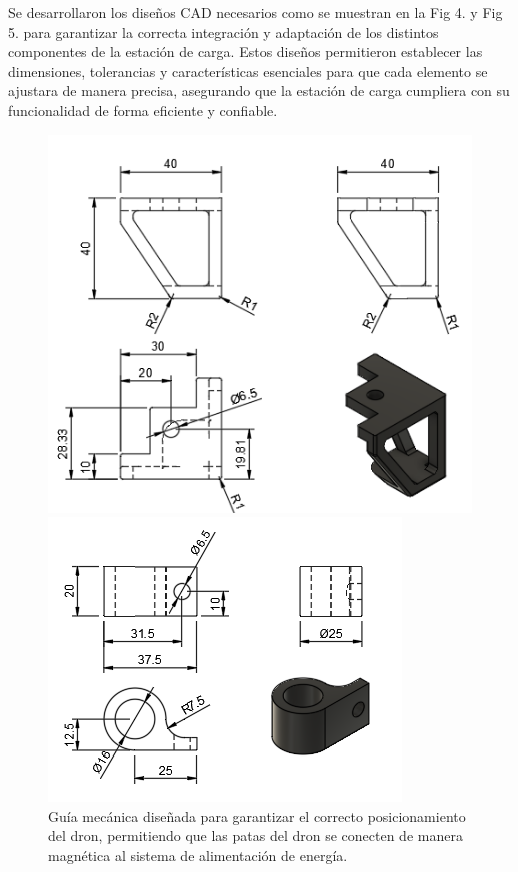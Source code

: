     Se desarrollaron los diseños CAD necesarios como se muestran en la Fig 4. y Fig 5. para garantizar la correcta integración y adaptación de los distintos componentes de la estación de carga. Estos diseños permitieron establecer las dimensiones, tolerancias y características esenciales para que cada elemento se ajustara de manera precisa, asegurando que la estación de carga cumpliera con su funcionalidad de forma eficiente y confiable.

    \begin{figure}[h]
        \centering
        \begin{minipage}{0.45\textwidth}
            \centering
            \includegraphics[width=\textwidth]{pictures/PLANO_PATAS_ESTABILIDAD_CAJON.png}
            \caption{Guía mecánica diseñada para garantizar el correcto posicionamiento del dron, permitiendo que las patas del dron se conecten de manera magnética al sistema de alimentación de energía.}
            \label{fig:imagen1}
        \end{minipage}%
        \hfill
        \begin{minipage}{0.45\textwidth}
            \centering
            \includegraphics[width=\textwidth]{pictures/PLANO_SENSOR.png}

\end{minipage}
\end{figure}

